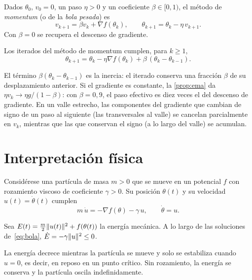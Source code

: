 \begin{definicion}[Momentum]\label{def:momentum}
Dados $\theta_0$, $v_0=0$, un paso $\eta>0$ y un coeficiente $\beta\in[0,1)$, el método de \emph{momentum} (o de la \emph{bola pesada}) es
\[
v_{k+1}=\beta v_k+\nabla f(\theta_k),\qquad \theta_{k+1}=\theta_k-\eta\,v_{k+1}.
\]
Con $\beta=0$ se recupera el descenso de gradiente.
\end{definicion}

\begin{proposicion}\label{prop:dos-pasos}
Los iterados del método de momentum cumplen, para $k\ge 1$,
\[
\theta_{k+1}=\theta_k-\eta\nabla f(\theta_k)+\beta\,(\theta_k-\theta_{k-1}).
\]
\end{proposicion}

El término $\beta(\theta_k-\theta_{k-1})$ es la inercia: el iterado conserva una fracción $\beta$ de su desplazamiento anterior. Si el gradiente es constante, la \cref{prop:ema} da $\eta v_k\to\eta g/(1-\beta)$: con $\beta=0{,}9$, el paso efectivo es diez veces el del descenso de gradiente. En un valle estrecho, las componentes del gradiente que cambian de signo de un paso al siguiente (las transversales al valle) se cancelan parcialmente en $v_k$, mientras que las que conservan el signo (a lo largo del valle) se acumulan.

\addtocounter{definicion}{1}%

\section{Interpretación física}

Considérese una partícula de masa $m>0$ que se mueve en un potencial $f$ con rozamiento viscoso de coeficiente $\gamma>0$. Su posición $\theta(t)$ y su velocidad $u(t)=\dot\theta(t)$ cumplen
\begin{equation}\label{eq:bola}
m\,\dot u=-\nabla f(\theta)-\gamma\,u,\qquad\dot\theta=u.
\end{equation}

\begin{proposicion}\label{prop:energia}
Sea $E(t)=\frac{m}{2}\lVert u(t)\rVert^{2}+f(\theta(t))$ la energía mecánica. A lo largo de las soluciones de~\eqref{eq:bola}, $\dot E=-\gamma\lVert u\rVert^{2}\le 0$.
\end{proposicion}

La energía decrece mientras la partícula se mueve y solo se estabiliza cuando $u=0$, es decir, en reposo en un punto crítico. Sin rozamiento, la energía se conserva y la partícula oscila indefinidamente.

